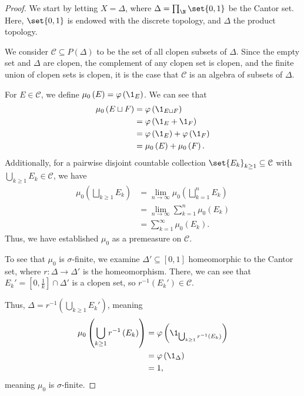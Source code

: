 \documentclass[10pt]{mypackage}
\begin{document}
\begin{proof}
  We start by letting $X = \Delta$, where $\Delta = \prod_{\N}\set{0,1}$ be the Cantor set. Here, $\set{0,1}$ is endowed with the discrete topology, and $\Delta$ the product topology.\newline

  We consider $\mathcal{C}\subseteq P(\Delta)$ to be the set of all clopen subsets of $\Delta$. Since the empty set and $\Delta$ are clopen, the complement of any clopen set is clopen, and the finite union of clopen sets is clopen, it is the case that $\mathcal{C}$ is an algebra of subsets of $\Delta$.\newline

  For $E\in \mathcal{C}$, we define $\mu_0\left(E\right) = \varphi\left(\1_{E}\right)$. We can see that
  \begin{align*}
    \mu_0\left(E\sqcup F\right) &= \varphi\left(\1_{E\sqcup F}\right)\\
                              &= \varphi\left(\1_{E} + \1_{F}\right)\\
                              &= \varphi\left(\1_{E}\right) + \varphi\left(\1_{F}\right)\\
                              &= \mu_0\left(E\right) + \mu_{0}\left(F\right).
  \end{align*}
  Additionally, for a pairwise disjoint countable collection $\set{E_k}_{k\geq 1}\subseteq \mathcal{C}$ with $\bigcup_{k\geq 1}E_k\in \mathcal{C}$, we have
  \begin{align*}
    \mu_0\left(\bigsqcup_{k\geq 1}E_k\right) &= \lim_{n\rightarrow\infty}\mu_0\left(\bigsqcup_{k=1}^{n}E_k\right)\\
                                             &= \lim_{n\rightarrow\infty}\sum_{k=1}^{n}\mu_0\left(E_k\right)\\
                                             &= \sum_{k=1}^{\infty}\mu_0\left(E_k\right).
  \end{align*}
  Thus, we have established $\mu_0$ as a premeasure on $\mathcal{C}$.\newline

  To see that $\mu_0$ is $\sigma$-finite, we examine $\Delta'\subseteq [0,1]$ homeomorphic to the Cantor set, where $r: \Delta \rightarrow \Delta'$ is the homeomorphism. There, we can see that $E_k' = \left[ 0,\frac{1}{k} \right]\cap \Delta'$ is a clopen set, so $r^{-1}\left(E_k'\right)\in \mathcal{C}$.\newline

  Thus, $\Delta = r^{-1}\left(\bigcup_{k\geq 1}E_k'\right)$, meaning
  \begin{align*}
    \mu_0\left(\bigcup_{k\geq 1}r^{-1}\left(E_k\right)\right) &= \varphi\left(\1_{\bigcup_{k\geq 1}r^{-1}\left(E_k\right)}\right)\\
                                                            &= \varphi\left(\1_{\Delta}\right)\\
                                                            &= 1,
  \end{align*}
  meaning $\mu_0$ is $\sigma$-finite.\newline


\end{proof}
\end{document}
